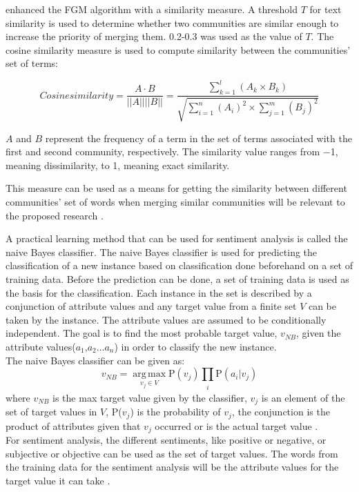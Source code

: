  enhanced the FGM algorithm with a similarity measure. A threshold $T$ for text similarity is used to determine whether two communities are similar enough to increase the priority of merging them. 0.2-0.3 was used as the value of $T$. The cosine similarity measure is used to compute similarity between the communities' set of terms:


\begin{equation}
	Cosine similarity = \frac {A \cdot B}{||A|| ||B||} = \frac {\sum_{k = 1}^{l}(A_k \times B_k)}{\sqrt{\sum_{i = 1}^{n} (A_i)^2 \times \sum_{j = 1}^{m} (B_j)^2}}
\end{equation}


$A$ and $B$ represent the frequency of a term in the set of terms associated with the first and second community, respectively. The similarity value ranges from −1, meaning dissimilarity, to 1, meaning exact similarity.


This measure can be used as a means for getting the similarity between different communities’ set of words when merging similar communities will be relevant to the proposed research \cite{Bakillah:2014}.


A practical learning method that can be used for sentiment analysis is called the naive Bayes classifier. The naive Bayes classifier is used for predicting the classification of a new instance based on classification done beforehand on a set of training data. Before the prediction can be done, a set of training data is used as the basis for the classification. Each instance in the set is described by a conjunction of attribute values and any target value from a finite set $V$ can be taken by the instance. The attribute values are assumed to be conditionally independent. The goal is to find the most probable target value, $v_{NB}$, given the attribute values($a_1$,$a_2$...$a_n$) in order to classify the new instance. \\ The naive Bayes classifier can be given as:
\begin{equation}
v_{NB} = \operatorname*{arg\,max}_{v_j \in V} \text{P}(v_j) \prod_{\substack{i}} \text{P}(a_i|v_j)
\end{equation}
where $v_{NB}$ is the max target value given by the classifier, $v_j$ is an element of the set of target values in $V$, P($v_j$) is the probability of $v_j$, the conjunction is the product of attributes given that $v_j$ occurred or is the actual target value \cite{Mitchell:1997}. \\
For sentiment analysis, the different sentiments, like positive or negative, or subjective or objective can be used as the set of target values. The words from the training data for the sentiment analysis will be the attribute values for the target value it can take \cite{Deitrick:2013}.


